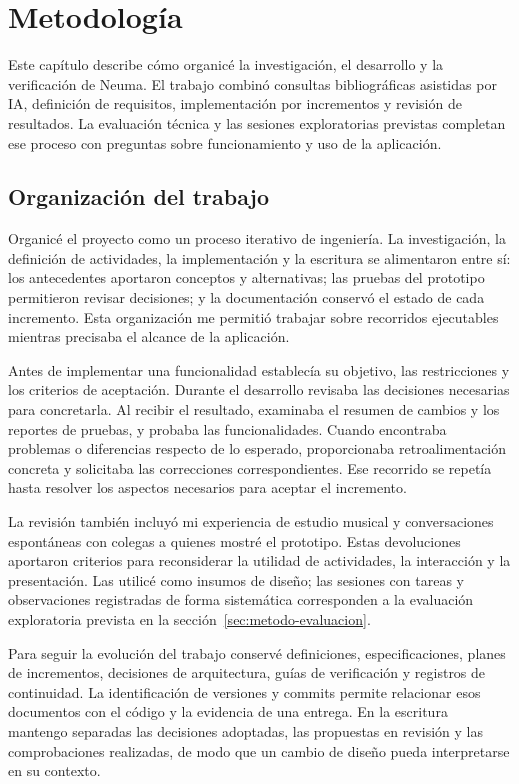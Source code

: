\chapter{Metodología}
\label{cap:metodologia}
Este capítulo describe cómo organicé la investigación, el desarrollo y la
verificación de Neuma. El trabajo combinó consultas bibliográficas asistidas por
IA, definición de requisitos, implementación por incrementos y revisión de resultados.
La evaluación técnica y las sesiones exploratorias previstas completan ese proceso
con preguntas sobre funcionamiento y uso de la aplicación.

\section{Organización del trabajo}
\label{sec:metodo-organizacion}
Organicé el proyecto como un proceso iterativo de ingeniería. La investigación,
la definición de actividades, la implementación y la escritura se alimentaron
entre sí: los antecedentes aportaron conceptos y alternativas; las pruebas del
prototipo permitieron revisar decisiones; y la documentación conservó el estado
de cada incremento. Esta organización me permitió trabajar sobre recorridos
ejecutables mientras precisaba el alcance de la aplicación.

Antes de implementar una funcionalidad establecía su objetivo, las restricciones
y los criterios de aceptación. Durante el desarrollo revisaba las decisiones
necesarias para concretarla. Al recibir el resultado, examinaba el resumen de
cambios y los reportes de pruebas, y probaba las funcionalidades. Cuando encontraba
problemas o diferencias respecto de lo esperado, proporcionaba retroalimentación
concreta y solicitaba las correcciones correspondientes. Ese recorrido se repetía
hasta resolver los aspectos necesarios para aceptar el incremento.

La revisión también incluyó mi experiencia de estudio musical y conversaciones
espontáneas con colegas a quienes mostré el prototipo. Estas devoluciones aportaron
criterios para reconsiderar la utilidad de actividades, la interacción y la
presentación. Las utilicé como insumos de diseño; las sesiones con tareas y
observaciones registradas de forma sistemática corresponden a la evaluación
exploratoria prevista en la sección~\ref{sec:metodo-evaluacion}.

Para seguir la evolución del trabajo conservé definiciones, especificaciones,
planes de incrementos, decisiones de arquitectura, guías de verificación y registros
de continuidad. La identificación de versiones y commits permite relacionar esos
documentos con el código y la evidencia de una entrega. En la escritura mantengo
separadas las decisiones adoptadas, las propuestas en revisión y las comprobaciones
realizadas, de modo que un cambio de diseño pueda interpretarse en su contexto.

